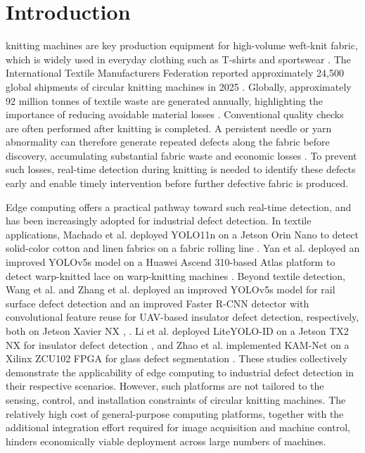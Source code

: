 \documentclass[journal]{IEEEtranTIE}
\begin{document}
\section{Introduction}
 knitting machines are key production equipment for high-volume weft-knit fabric, which is widely used in everyday clothing such as T-shirts and sportswear \cite{cottonworksKnitBasics,woolmarkCircularKnitting,cottonworksSingleDouble}. The International Textile Manufacturers Federation reported approximately 24,500 global shipments of circular knitting machines in 2025 \cite{itmf2025press}. Globally, approximately 92 million tonnes of textile waste are generated annually, highlighting the importance of reducing avoidable material losses \cite{unep2025textilewaste}. Conventional quality checks are often performed after knitting is completed. A persistent needle or yarn abnormality can therefore generate repeated defects along the fabric before discovery, accumulating substantial fabric waste and economic losses \cite{takeuchi2018knitted,akter2022material,xiang2023hooknet}. To prevent such losses, real-time detection during knitting is needed to identify these defects early and enable timely intervention before further defective fabric is produced.

Edge computing offers a practical pathway toward such real-time detection, and has been increasingly adopted for industrial defect detection. In textile applications, Machado et al. deployed YOLO11n on a Jetson Orin Nano to detect solid-color cotton and linen fabrics on a fabric rolling line \cite{machado2025edgefabric}. Yan et al. deployed an improved YOLOv5s model on a Huawei Ascend 310-based Atlas platform to detect warp-knitted lace on warp-knitting machines \cite{yan2026warplace}. Beyond textile detection, Wang et al. and Zhang et al. deployed an improved YOLOv5s model for rail surface defect detection and an improved Faster R-CNN detector with convolutional feature reuse for UAV-based insulator defect detection, respectively, both on Jetson Xavier NX \cite{wang2024rail}, \cite{zhang2026uavedge}. Li et al. deployed LiteYOLO-ID on a Jetson TX2 NX for insulator defect detection \cite{li2024liteyolo}, and Zhao et al. implemented KAM-Net on a Xilinx ZCU102 FPGA for glass defect segmentation \cite{zhao2025kamnet}. These studies collectively demonstrate the applicability of edge computing to industrial defect detection in their respective scenarios. However, such platforms are not tailored to the sensing, control, and installation constraints of circular knitting machines. The relatively high cost of general-purpose computing platforms, together with the additional integration effort required for image acquisition and machine control, hinders economically viable deployment across large numbers of machines.
\end{document}
